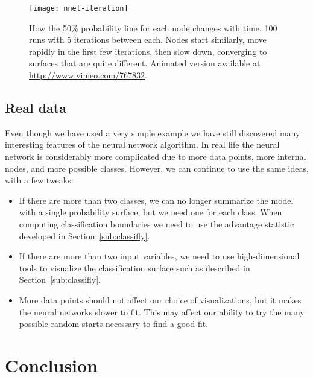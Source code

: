 \documentclass[preprint]{imsart}
\begin{document}
\begin{figure}[htbp]
  \centering
    \texttt{[image: nnet-iteration]}
  \caption{How the 50\% probability line for each node changes with time.  100 runs with 5 iterations between each.  Nodes start similarly, move rapidly in the first few iterations, then slow down, converging to surfaces that are quite different.  Animated version available at \url{http://www.vimeo.com/767832}.}
  \label{fig:nnet-iteration}
\end{figure}

\subsection{Real data}

Even though we have used a very simple example we have still discovered many interesting features of the neural network algorithm.  In real life the neural network is considerably more complicated due to more data points, more internal nodes, and more possible classes.  However, we can continue to use the same ideas, with a few tweaks:

\begin{itemize} \itemsep 0in
  \item If there are more than two classes, we can no longer summarize the model with a single probability surface, but we  need one for each class.  When computing classification boundaries we  need to use the advantage statistic developed in Section~\ref{sub:classifly}.

  \item If there are more than two input variables, we  need to use high-dimensional tools to visualize the classification surface such as described in Section~\ref{sub:classifly}.

  \item More data points should not affect our choice of visualizations, but it  makes the neural networks slower to fit.  This may affect our ability to try the many possible random starts necessary to find a good fit.

\end{itemize}

\section{Conclusion}
\label{sec:conclusion}
\end{document}
